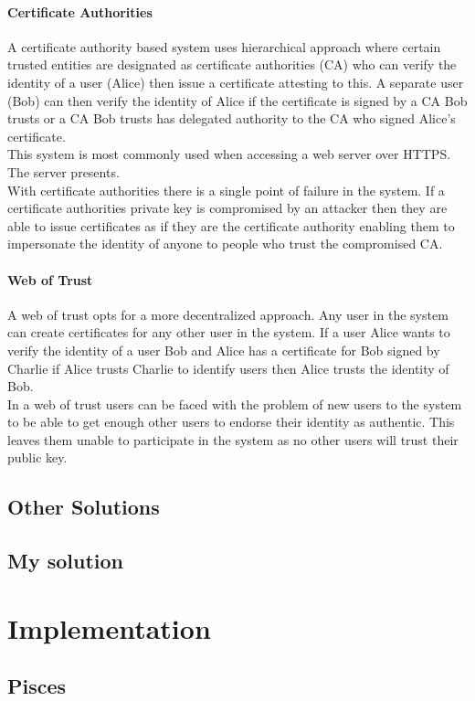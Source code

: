 \documentclass[12pt, a4paper]{article}
\begin{document}
\paragraph{Certificate Authorities}
A certificate authority based system uses hierarchical approach where certain trusted entities are designated as certificate authorities (CA) who can verify the identity of a user (Alice) then issue a certificate attesting to this. A separate user (Bob) can then verify the identity of Alice if the certificate is signed by a CA Bob trusts or a CA Bob trusts has delegated authority to the CA who signed Alice's certificate.\\
This system is most commonly used when accessing a web server over HTTPS\@. The server presents.\\
With certificate authorities there is a single point of failure in the system. If a certificate authorities private key is compromised by an attacker then they are able to issue certificates as if they are the certificate authority enabling them to impersonate the identity of anyone to people who trust the compromised CA.\@
\paragraph{Web of Trust}
A web of trust opts for a more decentralized approach. Any user in the system can create certificates for any other user in the system. If a user Alice wants to verify the identity of a user Bob and Alice has a certificate for Bob signed by Charlie if Alice trusts Charlie to identify users then Alice trusts the identity of Bob.\\
In a web of trust users can be faced with the problem of new users to the system to be able to get enough other users to endorse their identity as authentic. This leaves them unable to participate in the system as no other users will trust their public key. 
\subsection{Other Solutions}
\subsection{My solution}
\section{Implementation}
\subsection{Pisces}
\end{document}
